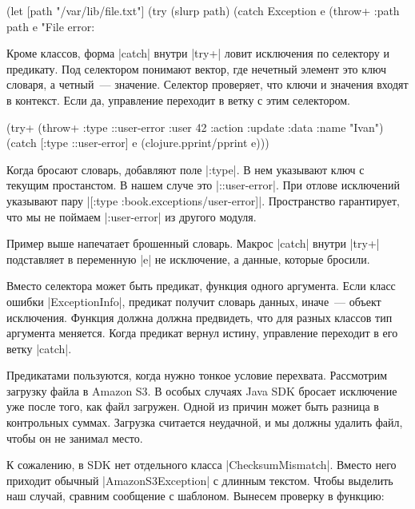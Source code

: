 \begin{english}
  \begin{clojure}
(let [path "/var/lib/file.txt"]
  (try
    (slurp path)
    (catch Exception e
      (throw+ {:path path} e "File error: %
  \end{clojure}
\end{english}

Кроме классов, форма \spverb|catch| внутри \spverb|try+| ловит исключения по
селектору и предикату. Под селектором понимают вектор, где нечетный элемент это
ключ словаря, а четный~--- значение. Селектор проверяет, что ключи и значения
входят в контекст. Если да, управление переходит в ветку с этим селектором.

\begin{english}
  \begin{clojure}
(try+
 (throw+ {:type ::user-error
          :user 42
          :action :update
          :data {:name "Ivan"}})
 (catch [:type ::user-error] e
   (clojure.pprint/pprint e)))
  \end{clojure}
\end{english}

Когда бросают словарь, добавляют поле \spverb|:type|. В нем указывают ключ с
текущим простанстом. В нашем случе это \spverb|::user-error|. При отлове
исключений указывают пару \spverb|[:type :book.exceptions/user-error]|.
Пространство гарантирует, что мы не поймаем \spverb|:user-error| из другого модуля.

Пример выше напечатает брошенный словарь. Макрос \spverb|catch| внутри
\spverb|try+| подставляет в переменную \spverb|e| не исключение, а данные,
которые бросили.

Вместо селектора может быть предикат, функция одного аргумента. Если класс
ошибки \spverb|ExceptionInfo|, предикат получит словарь данных, иначе~--- объект
исключения. Функция должна должна предвидеть, что для разных классов тип
аргумента меняется. Когда предикат вернул истину, управление переходит в его
ветку \spverb|catch|.

Предикатами пользуются, когда нужно тонкое условие перехвата. Рассмотрим
загрузку файла в Amazon S3. В особых случаях Java SDK бросает исключение уже
после того, как файл загружен. Одной из причин может быть разница в контрольных
суммах. Загрузка считается неудачной, и мы должны удалить файл, чтобы он не
занимал место.

К сожалению, в SDK нет отдельного класса \spverb|ChecksumMismatch|. Вместо него
приходит обычный \spverb|AmazonS3Exception| с длинным текстом. Чтобы выделить
наш случай, сравним сообщение с шаблоном. Вынесем проверку в функцию:

